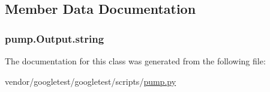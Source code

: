 \subsection{Member Data Documentation}
\subsubsection[{\texorpdfstring{string}{string}}]{\setlength{\rightskip}{0pt plus 5cm}pump.\+Output.\+string}\hypertarget{classpump_1_1Output_a8786848ab3d235189379c449a446f883}{}\label{classpump_1_1Output_a8786848ab3d235189379c449a446f883}


The documentation for this class was generated from the following file\+:\begin{DoxyCompactItemize}
\item 
vendor/googletest/googletest/scripts/\hyperlink{pump_8py}{pump.\+py}\end{DoxyCompactItemize}
